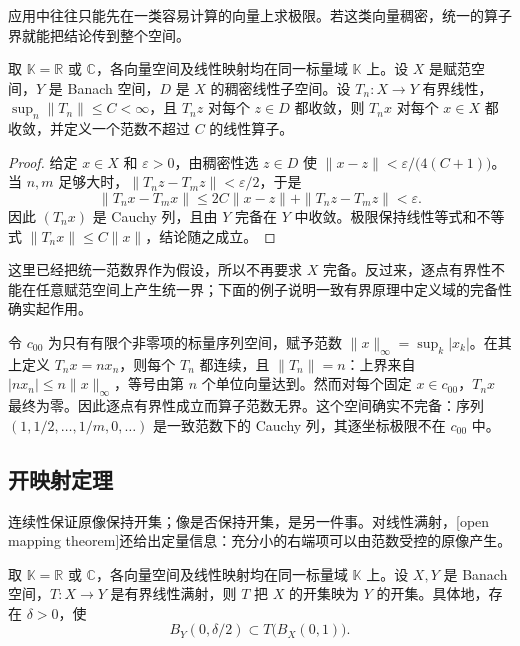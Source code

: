 \ProseParagraphBreak

应用中往往只能先在一类容易计算的向量上求极限。若这类向量稠密，统一的算子界就能把结论传到整个空间。

\begin{corollary}[从稠密子空间推广收敛]
\label{b1:cor:operator-convergence-dense-subspace}
取 \(\mathbb K=\mathbb R\) 或 \(\mathbb C\)，各向量空间及线性映射均在同一标量域 \(\mathbb K\) 上。设 \(X\) 是赋范空间，\(Y\) 是 Banach 空间，\(D\) 是 \(X\) 的稠密线性子空间。设 \(T_n:X\to Y\) 有界线性，\(\sup_n\|T_n\|\le C<\infty\)，且 \(T_nz\) 对每个 \(z\in D\) 都收敛，则 \(T_nx\) 对每个 \(x\in X\) 都收敛，并定义一个范数不超过 \(C\) 的线性算子。
\end{corollary}

\begin{proof}
给定 \(x\in X\) 和 \(\varepsilon>0\)，由稠密性选 \(z\in D\) 使 \(\|x-z\|<\varepsilon/\bigl(4(C+1)\bigr)\)。当 \(n,m\) 足够大时，\(\|T_nz-T_mz\|<\varepsilon/2\)，于是
\[
 \|T_nx-T_mx\|
 \le 2C\|x-z\|+\|T_nz-T_mz\|<\varepsilon.
\]
因此 \((T_nx)\) 是 Cauchy 列，且由 \(Y\) 完备在 \(Y\) 中收敛。极限保持线性等式和不等式 \(\|T_nx\|\le C\|x\|\)，结论随之成立。
\end{proof}

这里已经把统一范数界作为假设，所以不再要求 \(X\) 完备。反过来，逐点有界性不能在任意赋范空间上产生统一界；下面的例子说明一致有界原理中定义域的完备性确实起作用。

\ProseParagraphBreak

令 \(c_{00}\) 为只有有限个非零项的标量序列空间，赋予范数 \(\|x\|_\infty=\sup_k|x_k|\)。在其上定义 \(T_nx=nx_n\)，则每个 \(T_n\) 都连续，且 \(\|T_n\|=n\)：上界来自 \(|nx_n|\le n\|x\|_\infty\)，等号由第 \(n\) 个单位向量达到。然而对每个固定 \(x\in c_{00}\)，\(T_nx\) 最终为零。因此逐点有界性成立而算子范数无界。这个空间确实不完备：序列 \((1,1/2,\ldots,1/m,0,\ldots)\) 是一致范数下的 Cauchy 列，其逐坐标极限不在 \(c_{00}\) 中。

\subsection{开映射定理}
\label{b1:subsec:080303}

连续性保证原像保持开集；像是否保持开集，是另一件事。对线性满射，[open mapping theorem]还给出定量信息：充分小的右端项可以由范数受控的原像产生。

\begin{theorem}[开映射]
\label{b1:thm:open-mapping}
取 \(\mathbb K=\mathbb R\) 或 \(\mathbb C\)，各向量空间及线性映射均在同一标量域 \(\mathbb K\) 上。设 \(X,Y\) 是 Banach 空间，\(T:X\to Y\) 是有界线性满射，则 \(T\) 把 \(X\) 的开集映为 \(Y\) 的开集。具体地，存在 \(\delta>0\)，使
\[
 B_Y(0,\delta/2)\subset T\bigl(B_X(0,1)\bigr).
\]
\end{theorem}

